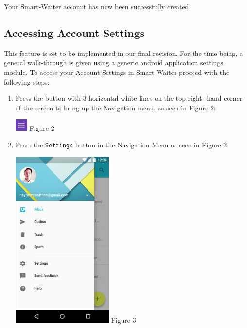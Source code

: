 \documentclass[12pt, titlepage]{article}
\begin{document}
Your Smart-Waiter account has now been successfully created.
\subsection{Accessing Account Settings}
This feature is set to be implemented in our final revision. For the time being, a general walk-through is given using a generic android application settings module. To access your Account Settings in Smart-Waiter proceed with the following steps:

\begin{enumerate}
	\item Press the button with 3 horizontal white lines on the top right-			hand corner of the screen to bring up the Navigation menu, as seen 			in Figure 2: 
	
	\begin{center}
	\includegraphics[width=0.05\textwidth]{ui-fragment-button.png}
	\linebreak Figure 2
	\end{center}

	\item Press the \texttt{Settings} button in the Navigation Menu as seen 	in Figure 3:

	\begin{center}
	\includegraphics[width=0.4\textwidth]{nav-menu.png}
	\linebreak Figure 3
	\end{center}

\end{enumerate}
\end{document}
